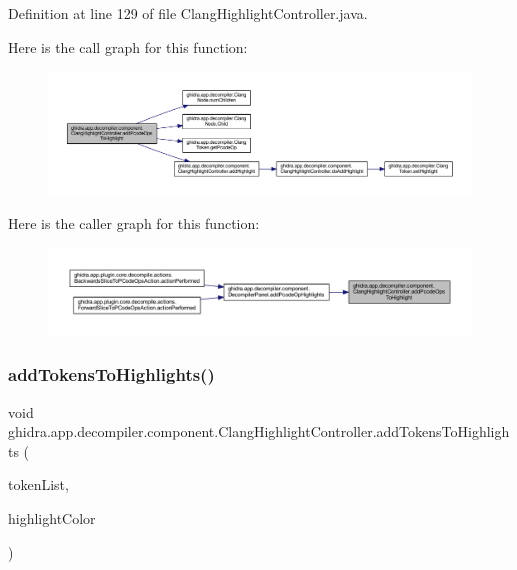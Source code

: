 Definition at line 129 of file Clang\+Highlight\+Controller.\+java.

Here is the call graph for this function\+:
\nopagebreak
\begin{figure}[H]
\begin{center}
\leavevmode
\includegraphics[width=350pt]{classghidra_1_1app_1_1decompiler_1_1component_1_1_clang_highlight_controller_a999122a27059713e3033e404e204e20f_cgraph}
\end{center}
\end{figure}
Here is the caller graph for this function\+:
\nopagebreak
\begin{figure}[H]
\begin{center}
\leavevmode
\includegraphics[width=350pt]{classghidra_1_1app_1_1decompiler_1_1component_1_1_clang_highlight_controller_a999122a27059713e3033e404e204e20f_icgraph}
\end{center}
\end{figure}
\mbox{\label{classghidra_1_1app_1_1decompiler_1_1component_1_1_clang_highlight_controller_a918b0d193cddef3e884da17c1813bb46}} 
\subsubsection{\texorpdfstring{addTokensToHighlights()}{addTokensToHighlights()}}
{\footnotesize\ttfamily void ghidra.\+app.\+decompiler.\+component.\+Clang\+Highlight\+Controller.\+add\+Tokens\+To\+Highlights (\begin{DoxyParamCaption}\item[{\mbox{\hyperlink{xml_8hh_ab5ab62f46b3735557c125f91b40ac155}{List}}$<$ \mbox{\hyperlink{classghidra_1_1app_1_1decompiler_1_1_clang_token}{Clang\+Token}} $>$}]{token\+List,  }\item[{Color}]{highlight\+Color }\end{DoxyParamCaption})\hspace{0.3cm}{\ttfamily [inline]}}



